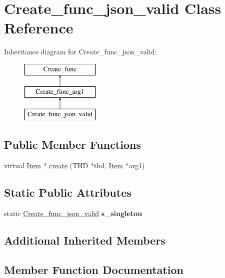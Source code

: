 \hypertarget{classCreate__func__json__valid}{}\section{Create\+\_\+func\+\_\+json\+\_\+valid Class Reference}
\label{classCreate__func__json__valid}
Inheritance diagram for Create\+\_\+func\+\_\+json\+\_\+valid\+:\begin{figure}[H]
\begin{center}
\leavevmode
\includegraphics[height=3.000000cm]{classCreate__func__json__valid}
\end{center}
\end{figure}
\subsection*{Public Member Functions}
\begin{DoxyCompactItemize}
\item 
virtual \mbox{\hyperlink{classItem}{Item}} $\ast$ \mbox{\hyperlink{classCreate__func__json__valid_aca6f7561a3fcdcab14cc3ff4387a7a0f}{create}} (T\+HD $\ast$thd, \mbox{\hyperlink{classItem}{Item}} $\ast$arg1)
\end{DoxyCompactItemize}
\subsection*{Static Public Attributes}
\begin{DoxyCompactItemize}
\item 
\mbox{\label{classCreate__func__json__valid_a1b5809b28e1008ba2e08c24f08d7d2cc}} 
static \mbox{\hyperlink{classCreate__func__json__valid}{Create\+\_\+func\+\_\+json\+\_\+valid}} {\bfseries s\+\_\+singleton}
\end{DoxyCompactItemize}
\subsection*{Additional Inherited Members}


\subsection{Member Function Documentation}
\mbox{\label{classCreate__func__json__valid_aca6f7561a3fcdcab14cc3ff4387a7a0f}} 

